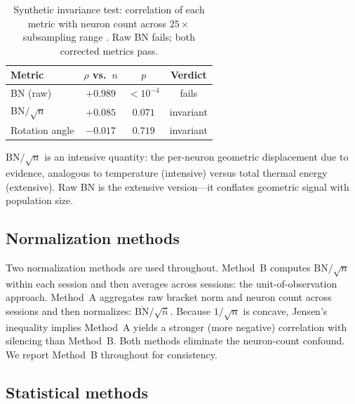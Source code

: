 \documentclass[9pt,lineno]{elife}
\begin{document}
\begin{table}[t]
\centering
\caption{Synthetic invariance test: correlation of each metric with neuron count across $25\times$ subsampling range \citep{dandi000017}. Raw BN fails; both corrected metrics pass.}
\label{tab:invariance}
\small
\begin{tabular}{lccc}
\toprule
Metric & $\rho$ vs.\ $n$ & $p$ & Verdict \\
\midrule
BN (raw) & $+0.989$ & $<10^{-4}$ & fails \\
BN$/\!\sqrt{n}$ & $+0.085$ & $0.071$ & invariant \\
Rotation angle & $-0.017$ & $0.719$ & invariant \\
\bottomrule
\end{tabular}
\end{table}

$\text{BN}/\!\sqrt{n}$ is an intensive quantity: the per-neuron geometric displacement due to evidence, analogous to temperature (intensive) versus total thermal energy (extensive). Raw BN is the extensive version---it conflates geometric signal with population size.

\subsection{Normalization methods}
\label{sec:normalization}

Two normalization methods are used throughout. Method~B computes $\text{BN}/\!\sqrt{n}$ within each session and then averages across sessions: the unit-of-observation approach. Method~A aggregates raw bracket norm and neuron count across sessions and then normalizes: $\overline{\text{BN}}/\!\sqrt{\bar{n}}$. Because $1/\!\sqrt{n}$ is concave, Jensen's inequality implies Method~A yields a stronger (more negative) correlation with silencing than Method~B. Both methods eliminate the neuron-count confound. We report Method~B throughout for consistency.

\subsection{Statistical methods}
\label{sec:stats}
\end{document}
